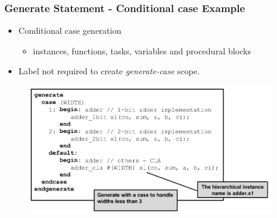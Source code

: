 \documentclass[t, notes, xcolor=table]{beamer}
\begin{document}
\begin{frame}
\frametitle{Generate Statement - Conditional case Example}
\begin{itemize}
\item Conditional case generation
\begin{itemize}
	\item instances, functions, tasks, variables and procedural blocks
\end{itemize}
\item Label not required to create \textit{generate-case} scope.
\end{itemize}
\begin{figure}
    \includegraphics[width=0.95\textwidth]{img/08_gen_case.png}
\end{figure}
\end{frame}
\end{document}
